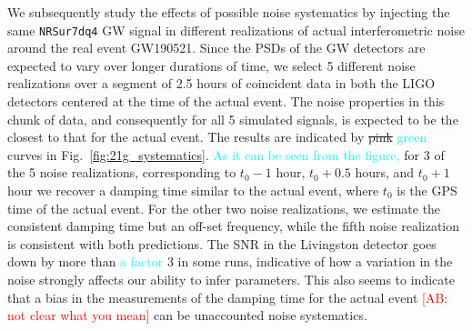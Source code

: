 \documentclass[twocolumn,prd,aps,superscriptaddress,preprintnumbers,tightenlines,showpacs,nofootinbib,eqsecnum,amsfonts,amsmath]{revtex4-1}
\newcommand{\ab}[1]{\textcolor{cyan}{#1}}
\newcommand{\comment}[1]{\textcolor{red}{[#1]}}
\begin{document}
We subsequently study the effects of possible noise systematics by
injecting the same \texttt{NRSur7dq4} GW signal in different
realizations of actual interferometric noise around the real event
GW190521. Since the PSDs of the GW detectors are expected to vary over
longer durations of time, we select 5 different noise realizations
over a segment of 2.5 hours of coincident data in both the LIGO
detectors centered at the time of the actual event. The noise
properties in this chunk of data, and consequently for all 5 simulated
signals, is expected to be the closest to that for the actual
event. The results are indicated by \sout{pink} \ab{green} curves in
Fig.~\ref{fig:21g_systematics}. \ab{As it can be seen from the figure,} 
for 3 of the 5 noise realizations,
corresponding to $t_0-1$ hour, $t_0+0.5$ hours, and $t_0+1$ hour we
recover a damping time similar to the actual event, where $t_0$ is the
GPS time of the actual event. For the other two noise realizations, we
estimate the consistent damping time but an off-set frequency, while
the fifth noise realization is consistent with both predictions. The
SNR in the Livingston detector goes down by more than \ab{a factor} 3 in some
runs, indicative of how a variation in the noise strongly affects our
ability to infer parameters. This also seems to indicate that a bias
in the measurements of the damping time for the actual event \comment{AB: not clear 
what you mean} can be unaccounted noise systematics.


%


\end{document}
